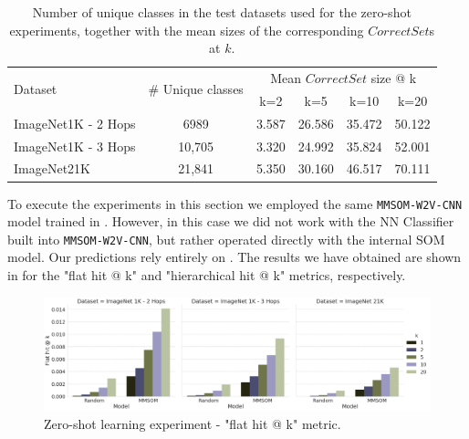 \documentclass[a4paper]{standalone}
\begin{document}
\begin{table}[h]
    \centering
    \begin{footnotesize}
        \begin{tabularx}{\textwidth}{|X|c|c|c|c|c|}
            \hline
            \multirow{2}{*}{Dataset} & \multirow{2}{*}{\# Unique classes} & \multicolumn{4}{c|}{Mean $CorrectSet$ size @ k} \\
            \cline{3-6}              &                                    & k=2      & k=5      & k=10     & k=20           \\ 
            \hline
            ImageNet1K - 2 Hops      & 6989                               & 3.587    & 26.586   & 35.472   & 50.122         \\ 
            ImageNet1K - 3 Hops      & 10,705                             & 3.320    & 24.992   & 35.824   & 52.001         \\ 
            ImageNet21K              & 21,841                             & 5.350    & 30.160   & 46.517   & 70.111         \\ 
            \hline
        \end{tabularx}
    \end{footnotesize}
    \caption{Number of unique classes in the test datasets used for the zero-shot experiments, together with the mean sizes of the corresponding $CorrectSet$s at $k$.}
    \label{tab:ZeroShotDatasetClassesNr}
\end{table}


To execute the experiments in this section we employed the same \verb|MMSOM-W2V-CNN| model trained in . However, in this case we did not work with the NN Classifier built into \verb|MMSOM-W2V-CNN|, but rather operated directly with the internal SOM model. Our predictions rely entirely on . The results we have obtained are shown in  for the "flat hit @ k" and "hierarchical hit @ k" metrics, respectively.

\begin{figure}[h]
    \centering
    \includegraphics[width=\textwidth]{images/zero_shot_flat_results.png}
    \caption{Zero-shot learning experiment - "flat hit @ k" metric.}
    \label{figZeroShotFlatResults}
\end{figure}
\end{document}
